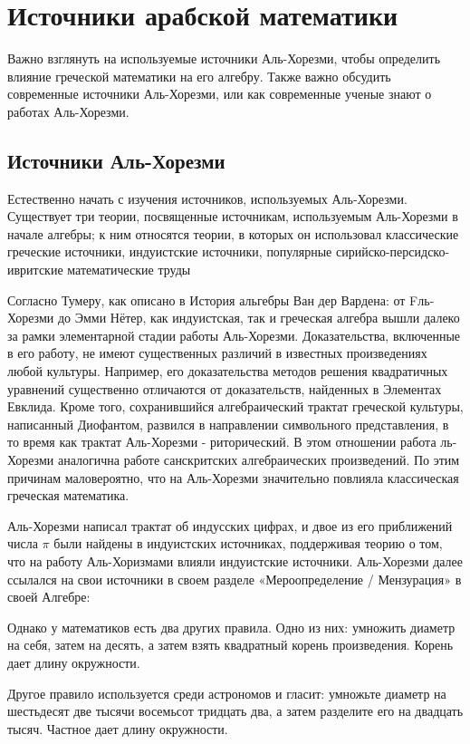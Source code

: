 \section{Источники арабской математики}
Важно взглянуть на используемые источники Аль-Хорезми, чтобы определить влияние греческой математики на его алгебру. Также важно обсудить современные источники Аль-Хорезми, или как современные ученые знают о работах Аль-Хорезми.

\subsection{Источники Аль-Хорезми}
Естественно начать с изучения источников, используемых Аль-Хорезми. Существует три теории, посвященные источникам, используемым Аль-Хорезми в начале алгебры; к ним относятся теории, в которых он использовал классические греческие источники, индуистские источники, популярные сирийско-персидско-ивритские математические труды

Согласно Тумеру, как описано в История альгебры Ван дер Вардена: от Fль-Хорезми до Эмми Нётер\cite{vanderwaer}, как индуистская, так и греческая алгебра вышли далеко за рамки элементарной стадии работы Аль-Хорезми. Доказательства, включенные в его работу, не имеют существенных различий в известных произведениях любой культуры. Например, его доказательства методов решения квадратичных уравнений существенно отличаются от доказательств, найденных в Элементах Евклида. Кроме того, сохранившийся алгебраический трактат греческой культуры, написанный Диофантом, развился в направлении символьного представления, в то время как  трактат Аль-Хорезми - риторический. В этом отношении работа ль-Хорезми аналогична работе санскритских алгебраических произведений. По этим причинам маловероятно, что на Аль-Хорезми значительно  повлияла классическая греческая математика.

Аль-Хорезми написал трактат об индусских цифрах, и двое из его приближений числа $\pi$ были найдены в индуистских источниках, поддерживая теорию о том, что на работу Аль-Хоризмами влияли индуистские источники. Аль-Хорезми далее ссылался на свои источники в своем разделе «Мероопределение / Мензурация» в своей Алгебре:

\begin{displayquote}
Однако у математиков есть два других правила. Одно из них: умножить диаметр на себя, затем на десять, а затем взять квадратный корень произведения. Корень дает длину окружности.

Другое правило используется среди астрономов и гласит: умножьте диаметр на шестьдесят две тысячи восемьсот тридцать два, а затем разделите его на двадцать тысяч. Частное дает длину окружности.
\end{displayquote}

